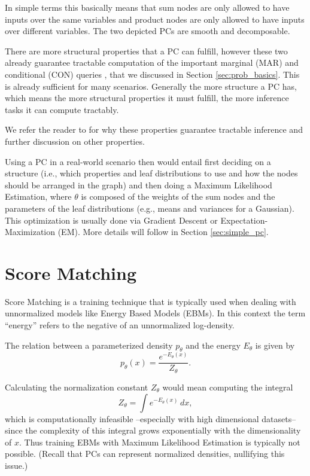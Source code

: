 In simple terms this basically means that sum nodes are only allowed to have inputs over the same variables and product nodes are
only allowed to have inputs over different variables. The two depicted PCs are smooth and decomposable.

There are more structural properties that a PC can fulfill, however these two already guarantee tractable computation of the important
marginal (MAR) and conditional (CON) queries \cite{pc_intro}, that we discussed in Section \ref{sec:prob_basics}. This is already sufficient for many scenarios. 
Generally the more structure a PC has, which means the more structural properties it must fulfill, the more inference tasks it can compute 
tractably. 

We refer the reader to \cite{pc_intro} for why these properties guarantee tractable inference 
and further discussion on other properties.

Using a PC in a real-world scenario then would entail first deciding on a structure (i.e., which properties and leaf 
distributions to use and how the nodes should be arranged in the graph) and then doing a Maximum Likelihood 
Estimation, where $\theta$ is composed of the weights of the sum nodes and the parameters of the leaf distributions (e.g., means and variances for a Gaussian). 
This optimization is usually done via Gradient Descent or Expectation-Maximization (EM). More details will follow in Section \ref{sec:simple_pc}.

\section{Score Matching}
\label{sec:sm}

Score Matching \cite{sm} is a training technique that is typically used when dealing with unnormalized models like Energy Based Models (EBMs). 
In this context the term ``energy'' refers to the negative of an unnormalized log-density. 

The relation between a parameterized density $p_\theta$ and the energy $E_\theta$ is given by
\[
    p_\theta(x) = \frac{e^{-E_\theta(x)}}{Z_\theta}.
\]

Calculating the normalization constant ${Z_\theta}$ would mean computing the integral 
\[
    Z_\theta = \int e^{-E_\theta(x)} \, dx, 
\]
which is computationally infeasible --especially with high dimensional datasets-- since the complexity of this integral grows exponentially with the dimensionality of $x$. Thus training EBMs with Maximum Likelihood Estimation is typically not possible.
(Recall that PCs can represent normalized densities, nullifying this issue.) \\

